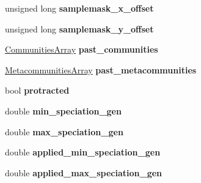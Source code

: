 \begin{DoxyCompactItemize}
\item 
unsigned long {\bfseries samplemask\+\_\+x\+\_\+offset}\hypertarget{group___community_objects_ac4985481c86bd62a50fa946699867216}{}\label{group___community_objects_ac4985481c86bd62a50fa946699867216}

\item 
unsigned long {\bfseries samplemask\+\_\+y\+\_\+offset}\hypertarget{group___community_objects_aeaebe975a46d62b70380e50ff7ebd09a}{}\label{group___community_objects_aeaebe975a46d62b70380e50ff7ebd09a}

\item 
\hyperlink{struct_communities_array}{Communities\+Array} {\bfseries past\+\_\+communities}\hypertarget{group___community_objects_a0726a962287af565658aaa8f9d9ea6c1}{}\label{group___community_objects_a0726a962287af565658aaa8f9d9ea6c1}

\item 
\hyperlink{struct_metacommunities_array}{Metacommunities\+Array} {\bfseries past\+\_\+metacommunities}\hypertarget{group___community_objects_ae00d8d9f52d163b040cc716955569ad3}{}\label{group___community_objects_ae00d8d9f52d163b040cc716955569ad3}

\item 
bool {\bfseries protracted}\hypertarget{group___community_objects_acab5a676e365934f9dfd2148ab9d5a60}{}\label{group___community_objects_acab5a676e365934f9dfd2148ab9d5a60}

\item 
double {\bfseries min\+\_\+speciation\+\_\+gen}\hypertarget{group___community_objects_a6b906ec2096b22631b60aa3511925fe0}{}\label{group___community_objects_a6b906ec2096b22631b60aa3511925fe0}

\item 
double {\bfseries max\+\_\+speciation\+\_\+gen}\hypertarget{group___community_objects_aeff6623b51fdd177e87b6eebfba27080}{}\label{group___community_objects_aeff6623b51fdd177e87b6eebfba27080}

\item 
double {\bfseries applied\+\_\+min\+\_\+speciation\+\_\+gen}\hypertarget{group___community_objects_aa5e9946a354a46d675e015d803cc7fa1}{}\label{group___community_objects_aa5e9946a354a46d675e015d803cc7fa1}

\item 
double {\bfseries applied\+\_\+max\+\_\+speciation\+\_\+gen}\hypertarget{group___community_objects_a77d20815b5638387ce186130657ec660}{}\label{group___community_objects_a77d20815b5638387ce186130657ec660}


\end{DoxyCompactItemize}
